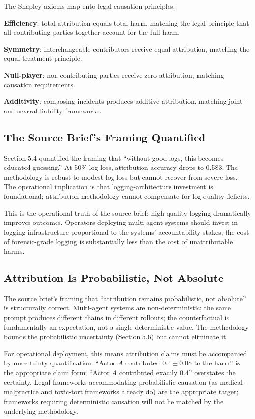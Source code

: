 \documentclass[sigconf,nonacm]{acmart}
\begin{document}
The Shapley axioms map onto legal causation principles:

\textbf{Efficiency}: total attribution equals total harm, matching
the legal principle that all contributing parties together account
for the full harm.

\textbf{Symmetry}: interchangeable contributors receive equal
attribution, matching the equal-treatment principle.

\textbf{Null-player}: non-contributing parties receive zero
attribution, matching causation requirements.

\textbf{Additivity}: composing incidents produces additive
attribution, matching joint-and-several liability frameworks.

\subsection{The Source Brief's Framing Quantified}

Section 5.4 quantified the framing that ``without good logs, this
becomes educated guessing.'' At 50\% log loss, attribution accuracy
drops to 0.583. The methodology is robust to modest log loss but
cannot recover from severe loss. The operational implication is
that logging-architecture investment is foundational; attribution
methodology cannot compensate for log-quality deficits.

This is the operational truth of the source brief: high-quality
logging dramatically improves outcomes. Operators deploying
multi-agent systems should invest in logging infrastructure
proportional to the systems' accountability stakes; the cost of
forensic-grade logging is substantially less than the cost of
unattributable harms.

\subsection{Attribution Is Probabilistic, Not Absolute}

The source brief's framing that ``attribution remains
probabilistic, not absolute'' is structurally correct.
Multi-agent systems are non-deterministic; the same prompt
produces different chains in different rollouts; the
counterfactual is fundamentally an expectation, not a single
deterministic value. The methodology bounds the probabilistic
uncertainty (Section 5.6) but cannot eliminate it.

For operational deployment, this means attribution claims must be
accompanied by uncertainty quantification. ``Actor $A$ contributed
$0.4 \pm 0.08$ to the harm'' is the appropriate claim form;
``Actor $A$ contributed exactly 0.4'' overstates the certainty.
Legal frameworks accommodating probabilistic causation (as
medical-malpractice and toxic-tort frameworks already do) are the
appropriate target; frameworks requiring deterministic causation
will not be matched by the underlying methodology.
\end{document}
